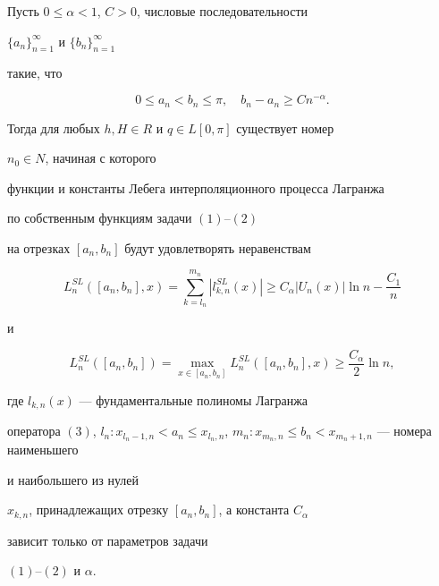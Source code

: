 \begin{thm} 


Пусть $0\le\alpha<1$, $C>0$, числовые последовательности 


$\{a_n\}^\infty_{n=1}$ и $\{b_n\}^\infty_{n=1}$ 


такие, что 


\begin{equation} 


0\le a_n<b_n\le\pi,\quad b_n-a_n\ge C n^{-\alpha}. 


\end{equation} 


Тогда для любых $h,H\in R$ и $q\in L[0,\pi]$ существует номер 


$n_0\in N$, начиная с которого 


функции и константы Лебега интерполяционного процесса Лагранжа 


по собственным функциям задачи $(1)$--$(2)$ 


на отрезках $[a_n,b_n]$ будут удовлетворять неравенствам 


\begin{equation} 


L^{SL}_n([a_n,b_n],x)=\sum^{m_n}_{k=l_n} 


|l^{SL}_{k,n}(x)|\ge C_\alpha|U_n(x)|\ln n-\frac{C_1}{n} 


\end{equation} 


и 


\begin{equation} 


L^{SL}_n([a_n,b_n])=\max_{x\in[a_n,b_n]}L^{SL}_n 


([a_n,b_n],x)\ge\frac{C_\alpha}{2}\ln n, 


\end{equation} 


где $l_{k,n}(x)$ --- фундаментальные полиномы Лагранжа 


оператора $(3)$, $l_n:x_{l_n-1,n}<a_n\le x_{l_n,n}$, $m_n:x_{m_n,n}\le 


b_n<x_{m_n+1,n}$ --- номера наименьшего 


и наибольшего из нулей 


$x_{k,n}$, принадлежащих отрезку $[a_n,b_n]$, а константа $C_\alpha$ 


зависит только от параметров задачи 


$(1)$--$(2)$ и $\alpha$. 


\end{thm} 


